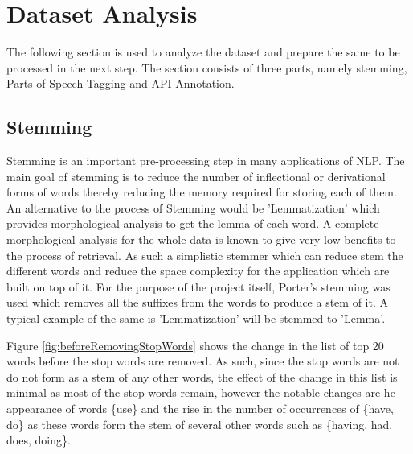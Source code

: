 \documentclass{sig-alternate-05-2015}
\begin{document}
\section{Dataset Analysis}
The following section is used to analyze the dataset and prepare the same to be processed in the next step. The section consists of three parts, namely stemming, Parts-of-Speech Tagging and API Annotation.

\subsection{Stemming}
Stemming is an important pre-processing step in  many applications of NLP. The main goal of stemming is to reduce the number of inflectional or derivational forms of words thereby reducing the memory required for storing each of them. An alternative to the process of Stemming would be 'Lemmatization' which provides morphological analysis to get the lemma of each word. A complete morphological analysis for the whole data is known to give very low benefits to the process of retrieval. As such a simplistic stemmer which can reduce stem the different words and reduce the space complexity for the application which are built on top of it. For the purpose of the project itself, Porter's stemming\cite{porter1980algorithm} was used which removes all the suffixes from the words to produce a stem of it. A typical example of the same is 'Lemmatization' will be stemmed to 'Lemma'.

Figure \ref{fig:beforeRemovingStopWords} shows the change in the list of top 20 words before the stop words are removed. As such, since the stop words are not do not form as a stem of any other words, the effect of the change in this list is minimal as most of the stop words remain, however the notable changes are he appearance of words \{use\} and the rise in the number of occurrences of \{have, do\} as these words form the stem of several other words such as \{having, had, does, doing\}.
\end{document}
